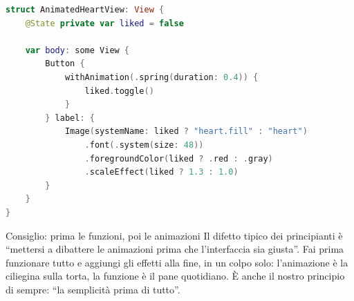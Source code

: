 \begin{lstlisting}[language=Swift]
struct AnimatedHeartView: View {
    @State private var liked = false

    var body: some View {
        Button {
            withAnimation(.spring(duration: 0.4)) {
                liked.toggle()
            }
        } label: {
            Image(systemName: liked ? "heart.fill" : "heart")
                .font(.system(size: 48))
                .foregroundColor(liked ? .red : .gray)
                .scaleEffect(liked ? 1.3 : 1.0)
        }
    }
}
\end{lstlisting}

\begin{tcbinfo}{Consiglio: prima le funzioni, poi le animazioni}
Il difetto tipico dei principianti è “mettersi a dibattere le animazioni prima che l'interfaccia sia giusta”. Fai prima funzionare tutto e aggiungi gli effetti alla fine, in un colpo solo: l'animazione è la ciliegina sulla torta, la funzione è il pane quotidiano. È anche il nostro principio di sempre: “la semplicità prima di tutto”.

\end{tcbinfo}

